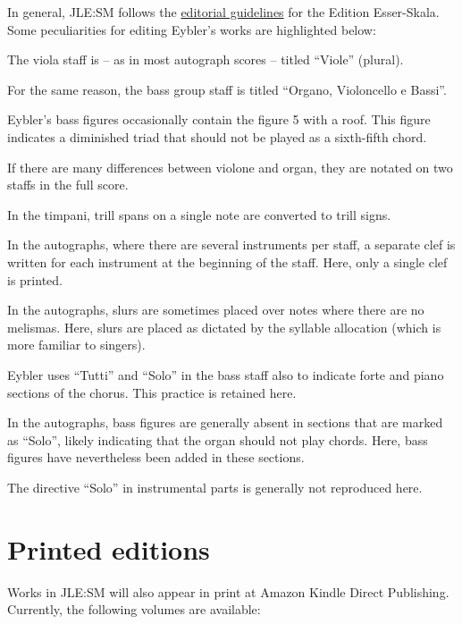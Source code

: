 \documentclass{ees}
\begin{document}
In general, JLE:SM follows the \href{https://edition.esser-skala.at/about/editorial-guidelines/}{editorial guidelines} for the Edition Esser-Skala. Some peculiarities for editing Eybler's works are highlighted below:

\begin{bulletlist}
  \item The viola staff is – as in most autograph scores – titled “Viole” (plural).
  \item For the same reason, the bass group staff is titled “Organo, Violoncello e Bassi”.
  \item Eybler's bass figures occasionally contain the figure 5 with a roof. This figure indicates a diminished triad that should not be played as a sixth-fifth chord.
  \item If there are many differences between violone and organ, they are notated on two staffs in the full score.
  \item In the timpani, trill spans on a single note are converted to trill signs.
  \item In the autographs, where there are several instruments per staff, a separate clef is written for each instrument at the beginning of the staff. Here, only a single clef is printed.
  \item In the autographs, slurs are sometimes placed over notes where there are no melismas. Here, slurs are placed as dictated by the syllable allocation (which is more familiar to singers).
  \item Eybler uses “Tutti” and “Solo” in the bass staff also to indicate forte and piano sections of the chorus. This practice is retained here.
  \item In the autographs, bass figures are generally absent in sections that are marked as “Solo”, likely indicating that the organ should not play chords. Here, bass figures have nevertheless been added in these sections.
  \item The directive “Solo” in instrumental parts is generally not reproduced here.
\end{bulletlist}

\section{Printed editions}

Works in JLE:SM will also appear in print at Amazon Kindle Direct Publishing. Currently, the following volumes are available:
\end{document}

